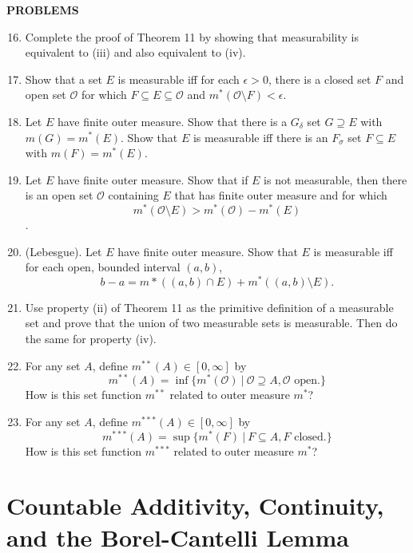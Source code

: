 \begin{center}
	\textbf{PROBLEMS}
\end{center}
\begin{enumerate}
	\setcounter{enumi}{15}
	\item Complete the proof of Theorem 11 by showing that measurability is equivalent to (iii) and also equivalent to (iv).
	\item Show that a set $E$ is measurable iff for each $\epsilon>0$, there is a closed set $F$ and open set $\mathcal{O}$ for which $F\subseteq E\subseteq \mathcal{O}$ and $m^*(\mathcal{O}\setminus F)<\epsilon$.
	\item Let $E$ have finite outer measure. Show that there is a $G_\delta$ set $G\supseteq E$ with $m(G)=m^*(E)$.
	Show that $E$ is measurable iff there is an $F_\sigma$ set $F \subseteq E$ with $m(F)=m^*(E)$. 
	\item Let $E$ have finite outer measure.
	Show that if $E$ is not measurable, then there is an open set $\mathcal{O}$ containing $E$ that has finite outer measure and for which \[m^*(\mathcal{O}\setminus E)>m^*(\mathcal{O})-m^*(E)\].
	\item (Lebesgue). Let $E$ have finite outer measure. Show that $E$ is measurable iff for each open, bounded interval $(a,b)$,
	\[
		b-a=m*((a,b)\cap E)+m^*((a,b)\setminus E).
	\]
	\item Use property (ii) of Theorem 11 as the primitive definition of a measurable set and prove that the union of two measurable sets is measurable. Then do the same for property (iv).
	\item For any set $A$, define $m^{**}(A)\in[0,\infty]$ by 
	\[
		m^{**}(A)=\inf\{m^*(\mathcal{O})\ |\ \mathcal{O}\supseteq A, \mathcal{O}\text{ open.}\}	
	\]
	How is this set function $m^{**}$ related to outer measure $m^*$?
	\item For any set $A$, define $m^{***}(A)\in[0,\infty]$ by
	\[
		m^{***}(A)=\sup\{m^*(F)\ |\ F\subseteq A, F\text{ closed.}\}	
	\]
	How is this set function $m^{***}$ related to outer measure $m^*$?
\end{enumerate}

\section{Countable Additivity, Continuity, and the Borel-Cantelli Lemma}


